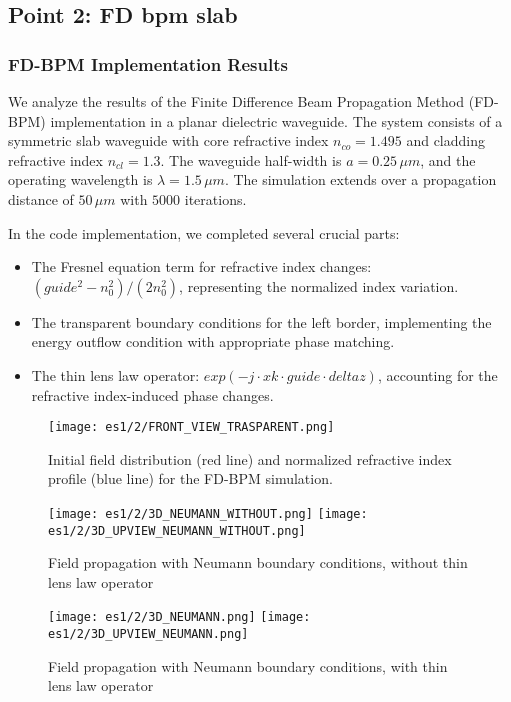 \documentclass{article}
\begin{document}
\subsection{Point 2: FD bpm slab}
\subsubsection{FD-BPM Implementation Results}

We analyze the results of the Finite Difference Beam Propagation Method (FD-BPM) implementation in a planar dielectric waveguide. The system consists of a symmetric slab waveguide with core refractive index $n_{co} = 1.495$ and cladding refractive index $n_{cl} = 1.3$. The waveguide half-width is $a = 0.25\,\mu m$, and the operating wavelength is $\lambda = 1.5\,\mu m$. The simulation extends over a propagation distance of $50\, \mu m$ with $5000$ iterations. 

In the code implementation, we completed several crucial parts:
\begin{itemize}
\item The Fresnel equation term for refractive index changes: 
   $(guide^2 - n_0^2)/(2n_0^2)$, representing the normalized index variation.
\item The transparent boundary conditions for the left border, implementing the energy outflow condition with appropriate phase matching.
\item The thin lens law operator: $exp(-j \cdot xk \cdot guide \cdot deltaz)$, accounting for the refractive index-induced phase changes.

\end{itemize}


\begin{figure}[h]
\centering
\texttt{[image: es1/2/FRONT\_VIEW\_TRASPARENT.png]}
\caption{Initial field distribution (red line) and normalized refractive index profile (blue line) for the FD-BPM simulation.}
\label{fig:initial_fd}
\end{figure}


\begin{figure}[h]
\centering
\texttt{[image: es1/2/3D\_NEUMANN\_WITHOUT.png]}
\texttt{[image: es1/2/3D\_UPVIEW\_NEUMANN\_WITHOUT.png]}
\caption{Field propagation with Neumann boundary conditions, without thin lens law operator}
\label{fig:neumann_no_lens}
\end{figure}

\begin{figure}[h]
\centering
\texttt{[image: es1/2/3D\_NEUMANN.png]}
\texttt{[image: es1/2/3D\_UPVIEW\_NEUMANN.png]}
\caption{Field propagation with Neumann boundary conditions, with thin lens law operator}
\label{fig:neumann_with_lens}
\end{figure}
\end{document}
